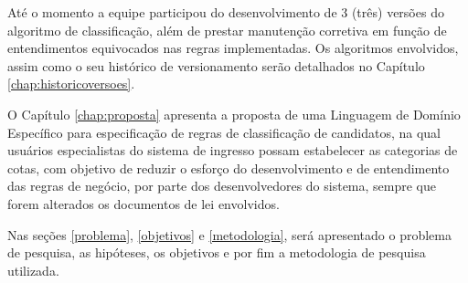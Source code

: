 Até o momento a equipe participou do desenvolvimento de 3 (três) versões do algoritmo de classificação, além de prestar manutenção corretiva em função de entendimentos equivocados nas regras implementadas.  Os algoritmos envolvidos, assim como o seu histórico de versionamento serão detalhados no Capítulo \ref{chap:historicoversoes}.

O Capítulo \ref{chap:proposta} apresenta a proposta de uma Linguagem de Domínio Específico para especificação de regras de classificação de candidatos, na qual usuários especialistas do sistema de ingresso possam estabelecer as categorias de cotas, com objetivo de reduzir o esforço do desenvolvimento e de entendimento das regras de negócio, por parte dos desenvolvedores do sistema, sempre que forem alterados os documentos de lei envolvidos.

Nas seções \ref{problema}, \ref{objetivos}  e \ref{metodologia}, será apresentado o problema de pesquisa, as hipóteses, os objetivos e por fim a metodologia de pesquisa utilizada.
